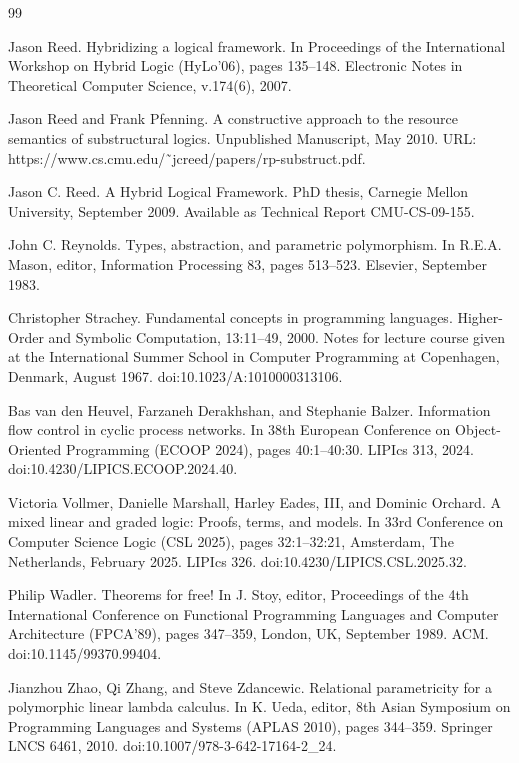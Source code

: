 \documentclass[10pt,a4paper]{amsart}
\begin{document}
\begin{thebibliography}{99}
\par\noindent  [39]  Jason Reed.  Hybridizing a logical framework.  In Proceedings of the International Workshop on Hybrid Logic (HyLo’06), pages 135–148. Electronic Notes in Theoretical Computer Science, v.174(6), 2007.  
 
\par\noindent  [40]  Jason Reed and Frank Pfenning.  A constructive approach to the resource semantics of substructural logics.  Unpublished Manuscript, May 2010.  URL: https://www.cs.cmu.edu/˜jcreed/papers/rp-substruct.pdf.  
 
\par\noindent  [41]  Jason C. Reed.  A Hybrid Logical Framework.  PhD thesis, Carnegie Mellon University, September 2009.  Available as Technical Report CMU-CS-09-155.  
 
\par\noindent  [42]  John C. Reynolds.  Types, abstraction, and parametric polymorphism.  In R.E.A. Mason, editor, Information Processing 83, pages 513–523. Elsevier, September 1983.  
 
\par\noindent  [43]  Christopher Strachey.  Fundamental concepts in programming languages.  Higher-Order and Symbolic Computation, 13:11–49, 2000.  Notes for lecture course given at the International Summer School in Computer Programming at Copenhagen, Denmark, August 1967.  doi:10.1023/A:1010000313106.  
 
\par\noindent  [44]  Bas van den Heuvel, Farzaneh Derakhshan, and Stephanie Balzer.  Information flow control in cyclic process networks.  In 38th European Conference on Object-Oriented Programming (ECOOP 2024), pages 40:1–40:30. LIPIcs 313, 2024.  doi:10.4230/LIPICS.ECOOP.2024.40.  
 
\par\noindent  [45]  Victoria Vollmer, Danielle Marshall, Harley Eades, III, and Dominic Orchard.  A mixed linear and graded logic: Proofs, terms, and models.  In 33rd Conference on Computer Science Logic (CSL 2025), pages 32:1–32:21, Amsterdam, The Netherlands, February 2025. LIPIcs 326.  doi:10.4230/LIPICS.CSL.2025.32.  
 
\par\noindent  [46]  Philip Wadler.  Theorems for free!  In J. Stoy, editor, Proceedings of the 4th International Conference on Functional Programming Languages and Computer Architecture (FPCA’89), pages 347–359, London, UK, September 1989. ACM.  doi:10.1145/99370.99404.  
 
\par\noindent  [47]  Jianzhou Zhao, Qi Zhang, and Steve Zdancewic.  Relational parametricity for a polymorphic linear lambda calculus.  In K. Ueda, editor, 8th Asian Symposium on Programming Languages and Systems (APLAS 2010), pages 344–359. Springer LNCS 6461, 2010.  doi:10.1007/978-3-642-17164-2\_24.  
  
\end{thebibliography}
\end{document}
